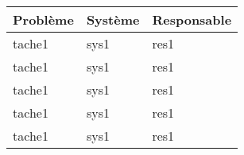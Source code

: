 \begin{tabularx}{\linewidth}{
    |>{\hsize=2.0\hsize}X|%
    >{\hsize=0.5\hsize}X|%
    >{\hsize=0.5\hsize}X|%
  }
    \hline
    Problème & Système & Responsable \\\hline
    tache1 & sys1 & res1 \\\hline
    tache1 & sys1 & res1 \\\hline
    tache1 & sys1 & res1 \\\hline
    tache1 & sys1 & res1 \\\hline
    tache1 & sys1 & res1 \\\hline
  \end{tabularx}
     